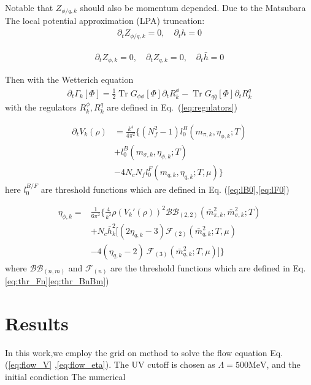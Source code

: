 \documentclass[%
reprint,
superscriptaddress,
showpacs,preprintnumbers,
 amsmath,amssymb,
 aps,
prd,
]{revtex4-1}
\newcommand{\Tr}{\ensuremath{\operatorname{Tr}}}
\def\Eq#1{Eq.~(\ref{#1})}
\begin{document}
Notable that $Z_{\phi/q,k}$ should also be momentum depended. Due to the Matsubara
The local  potential  approximation (LPA) truncation:
\begin{align}
\partial_t Z_{\phi/q,k}=0, \quad \partial_t h=0
\end{align}

\begin{align}
\partial_t Z_{\phi,k}=0,\quad \partial_t Z_{q,k}=0, \quad \partial_t \bar h=0
\end{align}

Then with the Wetterich equation
\begin{align}
	\partial_t \Gamma_k [\Phi] = \frac{1}{2}\Tr G_{\phi \phi} [\Phi]  \partial_t R^\phi_k-\Tr G_{q \bar q}[\Phi] \partial_t R^q_k
\end{align}
with the regulators $R^\phi_k,R^q_k$ are defined in \Eq{eq:regulators}

\begin{align}
	\partial_t V_k(\rho) &=\frac{k^4}{4 \pi^2} \{ ( N_f^2-1)l_0^B(m_{\pi,k},\eta_{\phi,k} ; T)\nonumber\\[2ex]
	&+l_0^B(m_{\sigma,k},\eta_{\phi,k}; T) \nonumber\\[2ex]
	&-4N_c N_f l_0^F(m_{q,k},\eta_{q,k};T,\mu)\}\label{eq:flow_V}
\end{align}
here $l_0^{B/F}$ are threshold functions which are defined in Eq. (\ref{eq:lB0},\ref{eq:lF0})

\begin{align}
	\eta_{\phi,k}=&\frac{1}{6\pi^2} \Big\{ \frac{4}{k^2} \rho (V_k'(\rho))^2  \mathcal{BB}_{(2,2)}(\bar m_{\pi,k}^2,\bar m_{\sigma,k}^2;T)\nonumber\\[2ex]
	&+N_c \bar h_k^2[(2 \eta_{q,k}-3)  \mathcal{F}_{(2)}(\bar m_{q,k}^2;T,\mu)\nonumber\\[2ex]
	&-4(\eta_{q,k}-2)\ \mathcal{F}_{(3)}(\bar m_{q,k}^2;T,\mu)] \Big\}\label{eq:flow_eta}
\end{align}
where $\mathcal{BB}_{(n,m)}$ and $\mathcal{F}_{(n)}$ are the threshold functions which are defined in Eq. \ref{eq:thr_Fn}\ref{eq:thr_BnBm})
\section{Results}
\label{sec:Results}

In this work,we employ the grid on method to solve the flow equation Eq. (\ref{eq:flow_V} ,\ref{eq:flow_eta}).
The UV cutoff is chosen as $\Lambda=500\mathrm{MeV}$, and the initial condiction
The numerical
\end{document}
